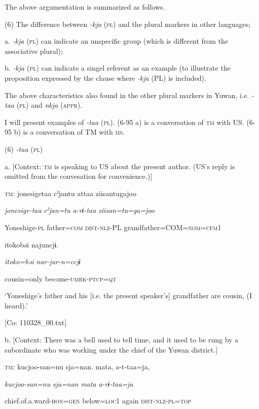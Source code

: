 The above argumentation is summarized as follows.

(6)  The difference between \textit{{}-kja} (\textsc{pl}) and the plural markers in other languages;

  a.  \textit{{}-kja} (\textsc{pl}) can indicate an unspecific group (which is different from the associative plural);

  b.  \textit{{}-kja} (\textsc{pl}) can indicate a singel referent as an example (to illustrate the proposition expressed by the clause where \textit{{}-kja} (PL) is included).

The above characteristics also found in the other plural markers in Yuwan, i.e. \textit{{}-taa} (\textsc{pl}) and \textit{nkja} (\textsc{appr}).

I will present examples of \textit{{}-taa} (\textsc{pl}). (6-95 a) is a conversation of \textsc{tm} with US. (6-95 b) is a conversation of TM with \textsc{ms}.

(6)  \textit{{}-taa} (\textsc{pl})

  a.  [Context: \textsc{tm} is speaking to US about the present author. (US’s reply is omitted from the convesation for convenience.)]

    \textsc{tm}:  jonesigetaa  cˀjantu  attaa  ziisantugajoo

      \textit{jonesige-taa}  \textit{cˀjan=tu}  \textit{a-rɨ-taa}  \textit{ziisan=tu=ga=joo}

      Yoneshige-\textsc{pl}  father=\textsc{com}  \textsc{dist}-\textsc{nlz}-PL  grandfather=COM=\textsc{nom}=\textsc{cfm}1

      {\textbar}itoko{\textbar}bəi  najuncjɨ.

      \textit{itoko=bəi}  \textit{nar-jur-n=ccjɨ}

      cousin=only  become-\textsc{umrk}-\textsc{ptcp}=\textsc{qt}

      ‘Yoneshige’s father and his [i.e. the present speaker’s] grandfather are cousin, (I heard).’

      [Co: 110328\_00.txt]

  b.  [Context: There was a bell used to tell time, and it used to be rung by a subordinate who was working under the chief of the Yuwan district.]

    \textsc{tm}:  kucjoo-san=nu  sja=nan.  mata,  a-t-taa=ja,

      \textit{kucjoo-san=nu}  \textit{sja=nan}  \textit{mata}  \textit{a-rɨ-taa=ja}

      chief.of.a.ward-\textsc{hon}=\textsc{gen}  below=\textsc{loc}1  again  \textsc{dist}-\textsc{nlz}-\textsc{pl}=\textsc{top}

